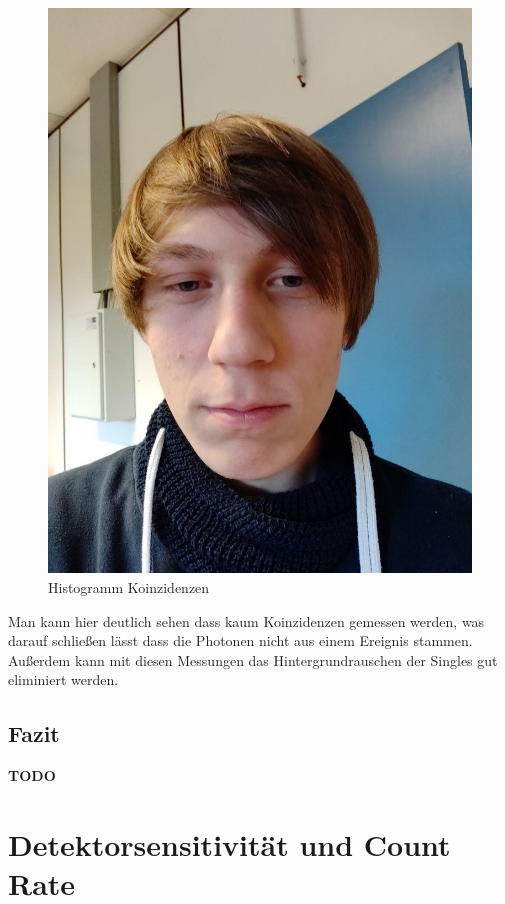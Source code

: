 \documentclass[12pt,twoside,a4paper]{scrartcl}
\begin{document}
\begin{figure}[H]
\begin{minipage}{0.49 \textwidth}
					\includegraphics[width=\textwidth]{Pictures/Platzhalter.jpg}
						\caption{Histogramm Koinzidenzen}
					\end{minipage}
		\end{figure}

		Man kann hier deutlich sehen dass kaum Koinzidenzen gemessen werden, was darauf schließen lässt dass die Photonen nicht aus einem Ereignis stammen.
		Außerdem kann mit diesen Messungen das Hintergrundrauschen der Singles gut eliminiert werden.

		\subsection{Fazit}

		\textbf{TODO}

	\section{Detektorsensitivität und Count Rate}
\end{document}

